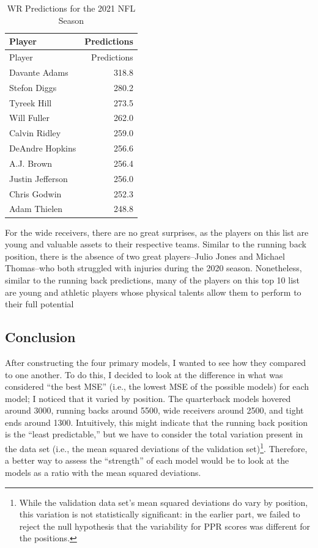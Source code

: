 \documentclass[
]{article}
\begin{document}
\begin{longtable}[]{@{}lr@{}}
\caption{WR Predictions for the 2021 NFL Season}\tabularnewline
\toprule
Player & Predictions \\
\midrule
\endfirsthead
\toprule
Player & Predictions \\
\midrule
\endhead
Davante Adams & 318.8 \\
Stefon Diggs & 280.2 \\
Tyreek Hill & 273.5 \\
Will Fuller & 262.0 \\
Calvin Ridley & 259.0 \\
DeAndre Hopkins & 256.6 \\
A.J. Brown & 256.4 \\
Justin Jefferson & 256.0 \\
Chris Godwin & 252.3 \\
Adam Thielen & 248.8 \\
\bottomrule
\end{longtable}

For the wide receivers, there are no great surprises, as the players on
this list are young and valuable assets to their respective teams.
Similar to the running back position, there is the absence of two great
players--Julio Jones and Michael Thomas--who both struggled with
injuries during the 2020 season. Nonetheless, similar to the running
back predictions, many of the players on this top 10 list are young and
athletic players whose physical talents allow them to perform to their
full potential

\hypertarget{conclusion}{%
\subsection{Conclusion}\label{conclusion}}

After constructing the four primary models, I wanted to see how they
compared to one another. To do this, I decided to look at the difference
in what was considered ``the best MSE'' (i.e., the lowest MSE of the
possible models) for each model; I noticed that it varied by position.
The quarterback models hovered around 3000, running backs around 5500,
wide receivers around 2500, and tight ends around 1300. Intuitively,
this might indicate that the running back position is the ``least
predictable,'' but we have to consider the total variation present in
the data set (i.e., the mean squared deviations of the validation
set)\footnote{While the validation data set's mean squared deviations do
  vary by position, this variation is not statistically significant: in
  the earlier part, we failed to reject the null hypothesis that the
  variability for PPR scores was different for the positions.}.
Therefore, a better way to assess the ``strength'' of each model would
be to look at the models as a ratio with the mean squared deviations.
\end{document}
